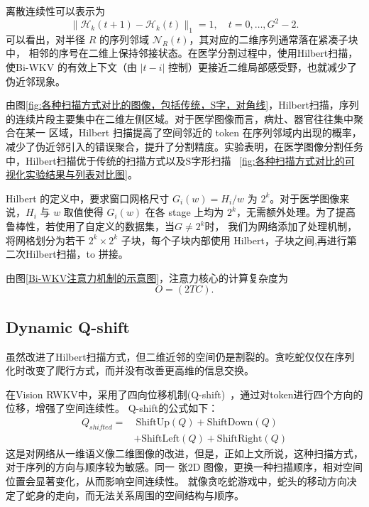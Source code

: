 \documentclass[conference]{IEEEtran}   %
\begin{document}
离散连续性可以表示为
\begin{equation}\label{eq:paper-auto-10}
    \|\mathcal{H}_k(t+1)-\mathcal{H}_k(t)\|_1 = 1,\quad t=0,\dots,G^2-2.
\end{equation}
可以看出，对半径 $R$ 的序列邻域 $\mathcal{N}_R(t)$，其对应的二维序列通常落在紧凑子块中，
相邻的序号在二维上保持邻接状态。在医学分割过程中，使用Hilbert扫描，使Bi-WKV 的有效上下文（由 $|t-i|$ 控制）更接近二维局部感受野，也就减少了伪近邻现象。

由图\ref{fig:各种扫描方式对比的图像，包括传统，S字，对角线}，Hilbert扫描，序列的连续片段主要集中在二维左侧区域。对于医学图像而言，病灶、器官往往集中聚合在某一
区域，Hilbert 扫描提高了空间邻近的 token 在序列邻域内出现的概率，减少了伪近邻引入的错误聚合，提升了分割精度。实验表明，在医学图像分割任务中，Hilbert扫描优于传统的扫描方式以及S字形扫描
~\ref{fig:各种扫描方式对比的可视化实验结果与列表对比图}。 


Hilbert 的定义中，要求窗口网格尺寸 $G_i(w)=H_i/w$ 为 $2^k$。对于医学图像来说，$H_i$ 与 $w$ 取值使得 $G_i(w)$ 在各 stage 上均为 $2^k$，无需额外处理。为了提高鲁棒性，若使用了自定义的数据集，当$G\not=2^k$时，
我们为网络添加了处理机制，将网格划分为若干 $2^k\times2^k$ 子块，每个子块内部使用 Hilbert，子块之间,再进行第二次Hilbert扫描，to 拼接。

由图\ref{Bi-WKV注意力机制的示意图}，注意力核心的计算复杂度为\begin{equation}\label{eq:paper-auto-11}O=(2TC).\end{equation}

\subsection{Dynamic Q-shift}
虽然改进了Hilbert扫描方式，但二维近邻的空间仍是割裂的。贪吃蛇仅仅在序列化时改变了爬行方式，而并没有改善更高维的信息交换。

在Vision RWKV中，采用了四向位移机制(Q-shift)~\cite{vrwkv}，通过对token进行四个方向的位移，增强了空间连续性。
Q-shift的公式如下：
\begin{equation}\label{eq:paper-auto-12}
\begin{aligned}
    Q_{shifted} = &\ \text{ShiftUp}(Q) + \text{ShiftDown}(Q) \\
    & + \text{ShiftLeft}(Q) + \text{ShiftRight}(Q)
\end{aligned}
\end{equation}
这是对网络从一维语义像二维图像的改进，但是，正如上文所说，这种扫描方式，对于序列的方向与顺序较为敏感。同一 张2D 图像，更换一种扫描顺序，相对空间位置会显著变化，从而影响空间连续性。
就像贪吃蛇游戏中，蛇头的移动方向决定了蛇身的走向，而无法关系周围的空间结构与顺序。
\end{document}
